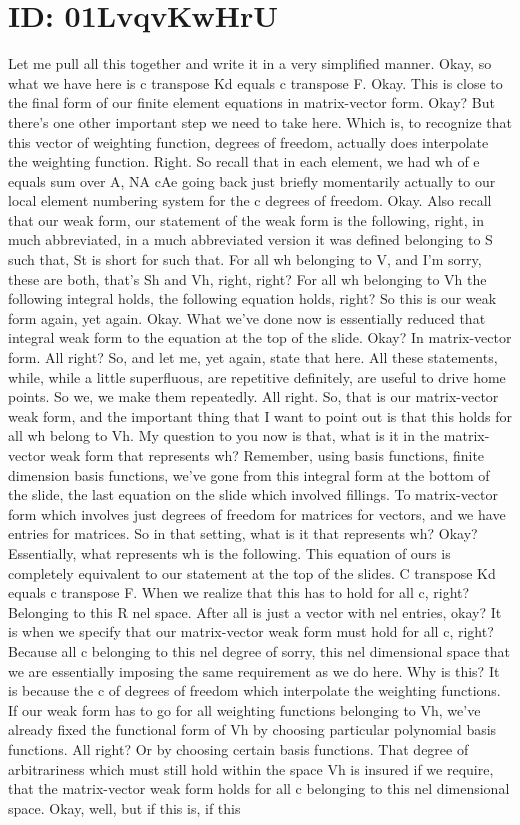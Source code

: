 \documentclass[10pt]{article}
\begin{document}
\section*{ID: 01LvqvKwHrU}
Let me pull all this together and write it in a very simplified manner. Okay, so what we have here is c transpose Kd equals c transpose F. Okay. This is close to the final form of our finite element equations in matrix-vector form. Okay? But there's one other important step we need to take here. Which is, to recognize that this vector of weighting function, degrees of freedom, actually does interpolate the weighting function. Right. So recall that in each element, we had wh of e equals sum over A, NA cAe going back just briefly momentarily actually to our local element numbering system for the c degrees of freedom. Okay. Also recall that our weak form, our statement of the weak form is the following, right, in much abbreviated, in a much abbreviated version it was defined belonging to S such that, St is short for such that. For all wh belonging to V, and I'm sorry, these are both, that's Sh and Vh, right, right? For all wh belonging to Vh the following integral holds, the following equation holds, right? So this is our weak form again, yet again. Okay. What we've done now is essentially reduced that integral weak form to the equation at the top of the slide. Okay? In matrix-vector form. All right? So, and let me, yet again, state that here. All these statements, while, while a little superfluous, are repetitive definitely, are useful to drive home points. So we, we make them repeatedly. All right. So, that is our matrix-vector weak form, and the important thing that I want to point out is that this holds for all wh belong to Vh. My question to you now is that, what is it in the matrix-vector weak form that represents wh? Remember, using basis functions, finite dimension basis functions, we've gone from this integral form at the bottom of the slide, the last equation on the slide which involved fillings. To matrix-vector form which involves just degrees of freedom for matrices for vectors, and we have entries for matrices. So in that setting, what is it that represents wh? Okay? Essentially, what represents wh is the following. This equation of ours is completely equivalent to our statement at the top of the slides. C transpose Kd equals c transpose F. When we realize that this has to hold for all c, right? Belonging to this R nel space. After all is just a vector with nel entries, okay? It is when we specify that our matrix-vector weak form must hold for all c, right? Because all c belonging to this nel degree of sorry, this nel dimensional space that we are essentially imposing the same requirement as we do here. Why is this? It is because the c of degrees of freedom which interpolate the weighting functions. If our weak form has to go for all weighting functions belonging to Vh, we've already fixed the functional form of Vh by choosing particular polynomial basis functions. All right? Or by choosing certain basis functions. That degree of arbitrariness which must still hold within the space Vh is insured if we require, that the matrix-vector weak form holds for all c belonging to this nel dimensional space. Okay, well, but if this is, if this 
\end{document}
